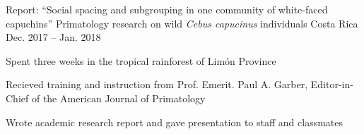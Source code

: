 

\begin{cventries}

  \cventry
    {Report: ``Social spacing and subgrouping in one community of white-faced capuchins''} %
    {Primatology research on wild \textit{Cebus capucinus} individuals} %
    {Costa Rica} %
    {Dec. 2017 -- Jan. 2018} %
    {
      \begin{cvitems} %
        \item {Spent three weeks in the tropical rainforest of Lim\'on Province}
        \item {Recieved training and instruction from Prof. Emerit. Paul A. Garber, Editor-in-Chief of the American Journal of Primatology}
        \item {Wrote academic research report and gave presentation to staff and classmates}
      \end{cvitems}
    }

\end{cventries}